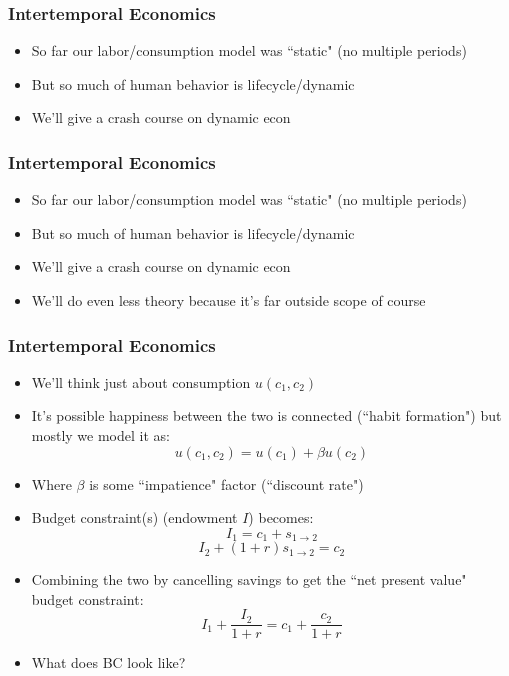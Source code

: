 \documentclass{beamer}
\author{Trevor S. Gallen}
\date{}
\begin{document}
\begin{frame}
\titlepage
\end{frame}

\begin{frame}
\frametitle[alignment=center]{Intertemporal Economics}
\begin{itemize}
\item So far our labor/consumption model was ``static" (no multiple periods)
\bigskip
\item But so much of human behavior is lifecycle/dynamic
\bigskip
\item We'll give a crash course on dynamic econ
\end{itemize}
\end{frame}

\begin{frame}
\frametitle[alignment=center]{Intertemporal Economics}
\begin{itemize}
\item So far our labor/consumption model was ``static" (no multiple periods)
\bigskip
\item But so much of human behavior is lifecycle/dynamic
\bigskip
\item We'll give a crash course on dynamic econ
\bigskip
\item We'll do even less theory because it's far outside scope of course
\end{itemize}
\end{frame}


\begin{frame}
\frametitle[alignment=center]{Intertemporal Economics}
\begin{itemize}
\item We'll think just about consumption $u(c_1,c_2)$
\bigskip
\item It's possible happiness between the two is connected (``habit formation") but mostly we model it as:
$$u(c_1,c_2)=u(c_1)+\beta u(c_2)$$
\item Where $\beta$ is some ``impatience" factor (``discount rate")
\bigskip
\item Budget constraint(s) (endowment $I$) becomes:
$$I_1=c_1+s_{1\rightarrow 2}$$
$$I_2+(1+r)s_{1\rightarrow 2}=c_2$$
\item Combining the two by cancelling savings to get the ``net present value" budget constraint:
$$I_1+\frac{I_2}{1+r}=c_1+\frac{c_2}{1+r}$$
\item What does BC look like?
\end{itemize}
\end{frame}
\end{document}
